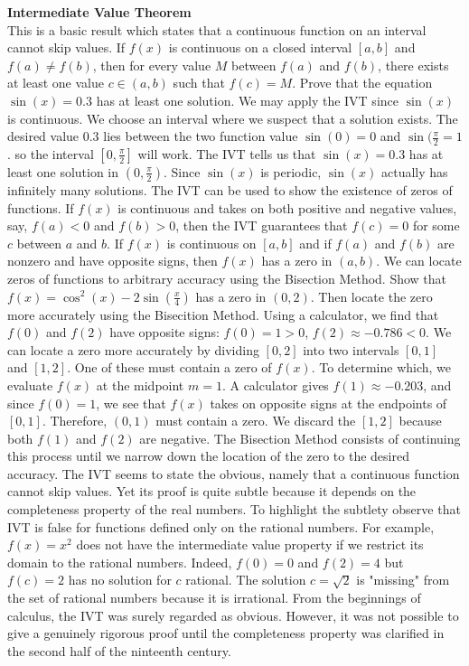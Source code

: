 \documentclass{article}
\begin{document}
\textbf{Intermediate Value Theorem}\\
	This is a basic result which states that a continuous function on an interval cannot skip values. If $f(x)$ is continuous on a closed interval $[a, b]$ and $f(a) \neq f(b)$, then for every value $M$ between $f(a)$ and $f(b)$, there exists at least one value $c \in (a, b)$ such that $f(c) = M$. Prove that the equation $\sin(x) = 0.3$ has at least one solution. We may apply the IVT since $\sin(x)$ is continuous. We choose an interval where we suspect that a solution exists. The desired value 0.3 lies between the two function value $\sin(0) = 0$ and $\sin(\frac{\pi}{2} = 1$. so the interval $[0 , \frac{\pi}{2}]$ will work. The IVT tells us that $\sin(x) = 0.3$ has at least one solution in $(0, \frac{\pi}{2})$. Since $\sin(x)$ is periodic, $\sin(x)$ actually has infinitely many solutions. The IVT can be used to show the existence of zeros of functions. If $f(x)$ is continuous and takes on both positive and negative values, say, $f(a) < 0$ and $f(b) > 0$, then the IVT guarantees that $f(c) = 0$ for some $c$ between $a$ and $b$. If $f(x)$ is continuous on $[a, b]$ and if $f(a)$ and $f(b)$ are nonzero and have opposite signs, then $f(x)$ has a zero in $(a, b)$. We can locate zeros of functions to arbitrary accuracy using the Bisection Method. Show that $f(x) = \cos^2(x) - 2\sin(\frac{x}{4})$ has a zero in $(0, 2)$. Then locate the zero more accurately using the Bisecition Method. Using a calculator, we find that $f(0)$ and $f(2)$ have opposite signs: $f(0) = 1 > 0$, $f(2) \approx -0.786 < 0$. We can locate a zero more accurately by dividing $[0, 2]$ into two intervals $[0, 1]$ and $[1, 2]$. One of these must contain a zero of $f(x)$. To determine which, we evaluate $f(x)$ at the midpoint $m = 1$. A calculator gives $f(1) \approx -0.203$, and since $f(0) = 1$, we see that $f(x)$ takes on opposite signs at the endpoints of $[0, 1]$. Therefore, $(0, 1)$ must contain a zero. We discard the $[1, 2]$ because both $f(1)$ and $f(2)$ are negative. The Bisection Method consists of continuing this process until we narrow down the location of the zero to the desired accuracy. The IVT seems to state the obvious, namely that a continuous function cannot skip values. Yet its proof is quite subtle because it depends on the completeness property of the real numbers. To highlight the subtlety observe that IVT is false for functions defined only on the rational numbers. For example, $f(x) = x^2$ does not have the intermediate value property if we restrict its domain to the rational numbers. Indeed, $f(0) = 0$ and $f(2) = 4$ but $f(c) = 2$ has no solution for $c$ rational. The solution $c = \sqrt{2}$ is "missing" from the set of rational numbers because it is irrational. From the beginnings of calculus, the IVT was surely regarded as obvious. However, it was not possible to give a genuinely rigorous proof until the completeness property was clarified in the second half of the ninteenth century.\\
\end{document}
